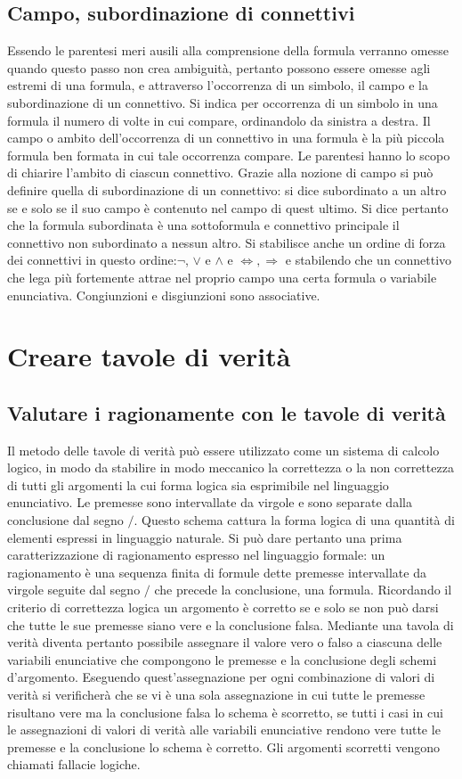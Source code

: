 \subsection{Campo, subordinazione di connettivi}
Essendo le parentesi meri ausili alla comprensione della formula verranno omesse quando questo passo non crea ambiguit\`a, pertanto possono essere omesse agli estremi di una formula, e attraverso 
l'occorrenza di un simbolo, il campo e la subordinazione di un connettivo. Si indica per occorrenza di un simbolo in una formula il numero di volte in cui compare, ordinandolo da sinistra  a destra. Il campo o 
ambito dell'occorrenza di un connettivo in una formula \`e la pi\`u piccola formula ben formata in cui tale occorrenza compare. Le parentesi hanno lo scopo di chiarire l'ambito di ciascun connettivo. Grazie alla 
nozione di campo si pu\`o definire quella di subordinazione di un connettivo: si dice subordinato a un altro se e solo se il suo campo \`e contenuto nel campo di quest ultimo. Si dice pertanto che la formula 
subordinata \`e una sottoformula e connettivo principale il connettivo non subordinato a nessun altro. Si stabilisce anche un ordine di forza dei connettivi in questo ordine:$\neg$,  $\lor$ e $\land$ e $
\Leftrightarrow, \Rightarrow$ e stabilendo che un connettivo che lega pi\`u fortemente attrae nel proprio campo una certa formula o variabile enunciativa. Congiunzioni e disgiunzioni sono associative. 
\section{Creare tavole di verit\`a}
\subsection{Valutare i ragionamente con le tavole di verit\`a}
Il metodo delle tavole di verit\`a pu\`o essere utilizzato come un sistema di calcolo logico, in modo da stabilire in modo meccanico la correttezza o la non correttezza di tutti gli argomenti la cui forma logica sia 
esprimibile nel linguaggio enunciativo. Le premesse sono intervallate da virgole e sono separate dalla conclusione dal segno $/$. Questo schema cattura la forma logica di una quantit\`a di elementi espressi in 
linguaggio naturale. Si pu\`o dare pertanto una prima caratterizzazione di ragionamento espresso nel linguaggio formale: un ragionamento \`e una sequenza finita di formule dette premesse intervallate da 
virgole seguite dal segno $/$ che precede la conclusione, una formula. Ricordando il criterio di correttezza logica un argomento \`e corretto se e solo se non pu\`o darsi che tutte le sue premesse siano vere e la 
conclusione falsa. Mediante una tavola di verit\`a diventa pertanto possibile assegnare il valore vero o falso a ciascuna delle variabili enunciative che compongono le premesse e la conclusione degli schemi 
d'argomento. Eseguendo quest'assegnazione per ogni combinazione di valori di verit\`a si verificher\`a che se vi \`e una sola assegnazione in cui tutte le premesse risultano vere ma la conclusione falsa lo schema 
\`e scorretto, se tutti i casi in cui le assegnazioni di valori di verit\`a alle variabili enunciative rendono vere tutte le premesse e la conclusione lo schema \`e corretto. Gli argomenti scorretti vengono chiamati 
fallacie logiche. 
